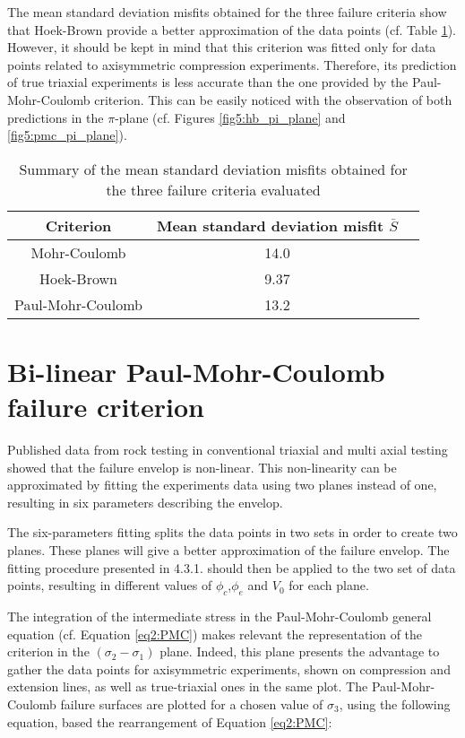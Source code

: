 The mean standard deviation misfits obtained for the three failure criteria show that Hoek-Brown provide a better approximation of the data points (cf. Table \ref{tb5:stand_dev}). However, it should be kept in mind that this criterion was fitted only for data points related to axisymmetric compression experiments. Therefore, its prediction of true triaxial experiments is less accurate than the one provided by the Paul-Mohr-Coulomb criterion. This can be easily noticed with the observation of both predictions in the $\pi$-plane (cf. Figures \ref{fig5:hb_pi_plane} and \ref{fig5:pmc_pi_plane}). 

\begin{table}
    \centering
    \begin{tabular}{ccc}
        \hline 
        Criterion & Mean standard deviation misfit $\bar{S}$ \\
        \hline
        \hline
        Mohr-Coulomb & 14.0 \\
        Hoek-Brown & 9.37 \\
        Paul-Mohr-Coulomb & 13.2 \\
        \hline
    \end{tabular}
    \captionsetup{justification=centering}
    \caption{Summary of the mean standard deviation misfits obtained for the three failure criteria evaluated}
    \label{tb5:stand_dev}
\end{table}
 
\section{Bi-linear Paul-Mohr-Coulomb failure criterion}\label{ch5:PMC}

Published data from rock testing in conventional triaxial and multi axial testing showed that the failure envelop is non-linear. This non-linearity can be approximated by fitting the experiments data using two planes instead of one, resulting in six parameters describing the envelop. 

The six-parameters fitting splits the data points in two sets in order to create two planes. These planes will give a better approximation of the failure envelop. The fitting procedure presented in 4.3.1. should then be applied to the two set of data points, resulting in different values of $\phi_c$,$\phi_e$ and $V_0$ for each plane.  

The integration of the intermediate stress in the Paul-Mohr-Coulomb general equation (cf. Equation \ref{eq2:PMC}) makes relevant the representation of the criterion in the $(\sigma_2-\sigma_1)$ plane. Indeed, this plane presents the advantage to gather the data points for axisymmetric experiments, shown on compression and extension lines, as well as true-triaxial ones in the same plot. The Paul-Mohr-Coulomb failure surfaces are plotted for a chosen value of $\sigma_3$, using the following equation, based the rearrangement of Equation \ref{eq2:PMC}:

